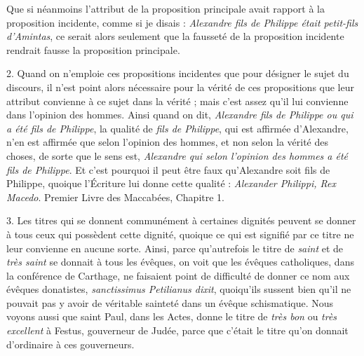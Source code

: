 Que si néanmoins l'attribut de la proposition principale avait rapport à la proposition incidente, comme si je disais : \emph{Alexandre fils de Philippe était petit-fils d'Amintas}, ce serait alors seulement que la fausseté de la proposition incidente rendrait fausse la proposition principale.

\bigbreak
{2.} Quand on n'emploie ces propositions incidentes que pour désigner le sujet du discours, il n'est point alors nécessaire pour la vérité de ces propositions que leur attribut convienne à ce sujet dans la vérité ; mais c'est assez qu'il lui convienne dans l'opinion des hommes. Ainsi quand on dit, \emph{Alexandre fils de Philippe ou qui a été fils de Philippe}, la qualité de \emph{fils de Philippe}, qui est affirmée d'Alexandre, n'en est affirmée que selon l'opinion des hommes, et non selon la vérité des choses, de sorte que le sens est, \emph{Alexandre qui selon l'opinion des hommes a été fils de Philippe}. Et c'est pourquoi il peut être faux qu'Alexandre soit fils de Philippe, quoique l'Écriture lui donne cette qualité : \emph{Alexander Philippi, Rex Macedo}. Premier Livre des Maccabées, Chapitre 1.

\bigbreak
{3.} Les titres qui se donnent communément à certaines dignités peuvent se donner à tous ceux qui possèdent cette dignité, quoique ce qui est signifié par ce titre ne leur convienne en aucune sorte. Ainsi, parce qu'autrefois le titre de \emph{saint} et de \emph{très saint} se donnait à tous les évêques, on voit que les évêques catholiques, dans la conférence de Carthage, ne faisaient point de difficulté de donner ce nom aux évêques donatistes, \emph{sanctissimus Petilianus dixit}, quoiqu'ils sussent bien qu'il ne pouvait pas y avoir de véritable sainteté dans un évêque schismatique. Nous voyons aussi que saint Paul, dans les Actes, donne le titre de \emph{très bon} ou \emph{très excellent} à Festus, gouverneur de Judée, parce que c'était le titre qu'on donnait d'ordinaire à ces gouverneurs.


